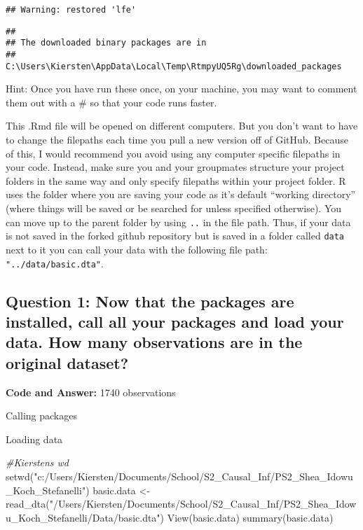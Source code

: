 \documentclass[
]{article}
\newenvironment{Shaded}{\begin{snugshade}}{\end{snugshade}}
\newcommand{\CommentTok}[1]{\textcolor[rgb]{0.56,0.35,0.01}{\textit{#1}}}
\newcommand{\FunctionTok}[1]{\textcolor[rgb]{0.00,0.00,0.00}{#1}}
\newcommand{\NormalTok}[1]{#1}
\newcommand{\OtherTok}[1]{\textcolor[rgb]{0.56,0.35,0.01}{#1}}
\newcommand{\StringTok}[1]{\textcolor[rgb]{0.31,0.60,0.02}{#1}}
\begin{document}
\begin{verbatim}
## Warning: restored 'lfe'
\end{verbatim}

\begin{verbatim}
## 
## The downloaded binary packages are in
##  C:\Users\Kiersten\AppData\Local\Temp\RtmpyUQ5Rg\downloaded_packages
\end{verbatim}

Hint: Once you have run these once, on your machine, you may want to
comment them out with a \# so that your code runs faster.

This .Rmd file will be opened on different computers. But you don't want
to have to change the filepaths each time you pull a new version off of
GitHub. Because of this, I would recommend you avoid using any computer
specific filepaths in your code. Instead, make sure you and your
groupmates structure your project folders in the same way and only
specify filepaths within your project folder. R uses the folder where
you are saving your code as it's default ``working directory'' (where
things will be saved or be searched for unless specified otherwise). You
can move up to the parent folder by using \texttt{..} in the file path.
Thus, if your data is not saved in the forked github repository but is
saved in a folder called \texttt{data} next to it you can call your data
with the following file path: \texttt{"../data/basic.dta"}.

\hypertarget{question-1-now-that-the-packages-are-installed-call-all-your-packages-and-load-your-data.-how-many-observations-are-in-the-original-dataset}{%
\subsection{Question 1: Now that the packages are installed, call all
your packages and load your data. How many observations are in the
original
dataset?}\label{question-1-now-that-the-packages-are-installed-call-all-your-packages-and-load-your-data.-how-many-observations-are-in-the-original-dataset}}

\textbf{Code and Answer:} 1740 observations

Calling packages

Loading data

\begin{Shaded}
\begin{Highlighting}[]
\CommentTok{\#Kiersten\textquotesingle{}s wd}
\FunctionTok{setwd}\NormalTok{(}\StringTok{"c:/Users/Kiersten/Documents/School/S2\_Causal\_Inf/PS2\_Shea\_Idowu\_Koch\_Stefanelli"}\NormalTok{)}
\NormalTok{basic.data }\OtherTok{\textless{}{-}} \FunctionTok{read\_dta}\NormalTok{(}\StringTok{"/Users/Kiersten/Documents/School/S2\_Causal\_Inf/PS2\_Shea\_Idowu\_Koch\_Stefanelli/Data/basic.dta"}\NormalTok{)}
\FunctionTok{View}\NormalTok{(basic.data)}
\FunctionTok{summary}\NormalTok{(basic.data)}
\end{Highlighting}
\end{Shaded}
\end{document}
